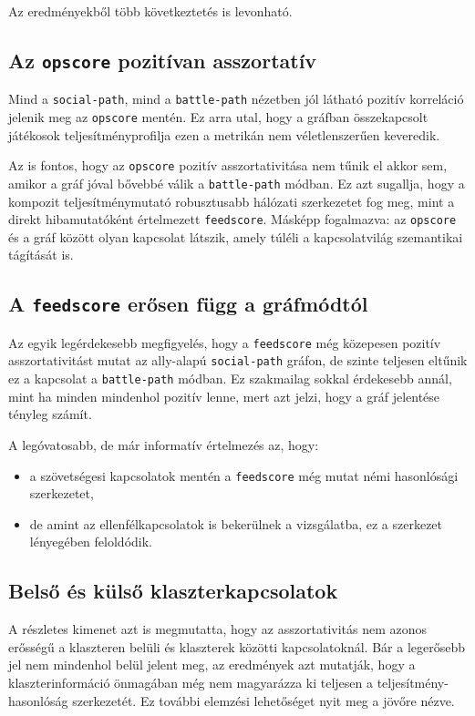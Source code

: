 \documentclass[a4paper,12pt]{report}
\begin{document}
Az eredményekből több következtetés is levonható.

\subsection{Az \texttt{opscore} pozitívan asszortatív}

Mind a \texttt{social-path}, mind a \texttt{battle-path} nézetben jól látható pozitív korreláció jelenik meg az \texttt{opscore} mentén. Ez arra utal, hogy a gráfban összekapcsolt játékosok teljesítményprofilja ezen a metrikán nem véletlenszerűen keveredik.

Az is fontos, hogy az \texttt{opscore} pozitív asszortativitása nem tűnik el akkor sem, amikor a gráf jóval bővebbé válik a \texttt{battle-path} módban. Ez azt sugallja, hogy a kompozit teljesítménymutató robusztusabb hálózati szerkezetet fog meg, mint a direkt hibamutatóként értelmezett \texttt{feedscore}. Másképp fogalmazva: az \texttt{opscore} és a gráf között olyan kapcsolat látszik, amely túléli a kapcsolatvilág szemantikai tágítását is.

\subsection{A \texttt{feedscore} erősen függ a gráfmódtól}

Az egyik legérdekesebb megfigyelés, hogy a \texttt{feedscore} még közepesen pozitív asszortativitást mutat az ally-alapú \texttt{social-path} gráfon, de szinte teljesen eltűnik ez a kapcsolat a \texttt{battle-path} módban. Ez szakmailag sokkal érdekesebb annál, mint ha minden mindenhol pozitív lenne, mert azt jelzi, hogy a gráf jelentése tényleg számít.

A legóvatosabb, de már informatív értelmezés az, hogy:

\begin{itemize}
    \item a szövetségesi kapcsolatok mentén a \texttt{feedscore} még mutat némi hasonlósági szerkezetet,
    \item de amint az ellenfélkapcsolatok is bekerülnek a vizsgálatba, ez a szerkezet lényegében feloldódik.
\end{itemize}

\subsection{Belső és külső klaszterkapcsolatok}

A részletes kimenet azt is megmutatta, hogy az asszortativitás nem azonos erősségű a klaszteren belüli és klaszterek közötti kapcsolatoknál. Bár a legerősebb jel nem mindenhol belül jelent meg, az eredmények azt mutatják, hogy a klaszterinformáció önmagában még nem magyarázza ki teljesen a teljesítmény-hasonlóság szerkezetét. Ez további elemzési lehetőséget nyit meg a jövőre nézve.
\end{document}
